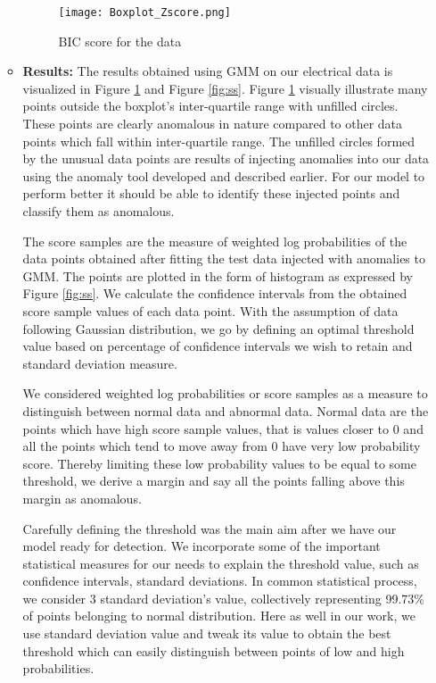 \begin{enumerate}
\begin{itemize}
\begin{figure}
\centerline{\texttt{[image: Boxplot\_Zscore.png]}}
    \caption{BIC score for the data}
    \label{fig:bic_zs}
\end{figure}
\item\textbf{Results:} The results obtained using GMM on our electrical data is visualized in Figure \ref{fig:bic_zs} and Figure \ref{fig:ss}. Figure \ref{fig:bic_zs} visually illustrate many points outside the boxplot's inter-quartile range with unfilled circles. These points are clearly anomalous in nature compared to other data points which fall within inter-quartile range. The unfilled circles formed by the unusual data points are results of injecting anomalies into our data using the anomaly tool developed and described earlier. For our model to perform better it should be able to identify these injected points and classify them as anomalous. 

The score samples are the measure of weighted log probabilities of the data points obtained after fitting the test data injected with anomalies to GMM. The points are plotted in the form of histogram as expressed by Figure \ref{fig:ss}. We calculate the confidence intervals from the obtained score sample values of each data point. With the assumption of data following Gaussian distribution, we go by defining an optimal threshold value based on percentage of confidence intervals we wish to retain and standard deviation measure.

We considered weighted log probabilities or score samples as a measure to distinguish between normal data and abnormal data. Normal data are the points which have high score sample values, that is values closer to 0 and all the points which tend to move away from 0 have very low probability score. Thereby limiting these low probability values to be equal to some threshold, we derive a margin and say all the points falling above this margin as anomalous. 

Carefully defining the threshold was the main aim after we have our model ready for detection. We incorporate some of the important statistical measures for our needs to explain the threshold value, such as confidence intervals, standard deviations. In common statistical process, we consider 3 standard deviation's value, collectively representing 99.73\% of points belonging to normal distribution. Here as well in our work, we use standard deviation value and tweak its value to obtain the best threshold which can easily distinguish between points of low and high probabilities.


\end{itemize}
\end{enumerate}
